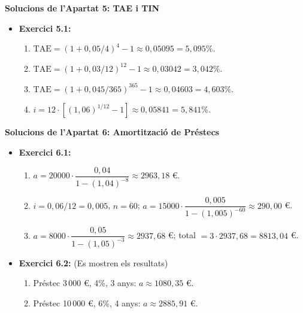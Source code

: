 \documentclass[12pt]{article}
\begin{document}
\begin{solucio}
\textbf{Solucions de l'Apartat 5: TAE i TIN}
\begin{itemize}
    \item \textbf{Exercici 5.1:}
    \begin{enumerate}[label=\alph*)]
        \item $\text{TAE} = (1 + 0{,}05/4)^4 - 1 \approx 0{,}05095 = 5{,}095\%$.
        \item $\text{TAE} = (1 + 0{,}03/12)^{12} - 1 \approx 0{,}03042 = 3{,}042\%$.
        \item $\text{TAE} = (1 + 0{,}045/365)^{365} - 1 \approx 0{,}04603 = 4{,}603\%$.
        \item $i = 12 \cdot [(1{,}06)^{1/12} - 1] \approx 0{,}05841 = 5{,}841\%$.
    \end{enumerate}
\end{itemize}
\end{solucio}

\begin{solucio}
\textbf{Solucions de l'Apartat 6: Amortització de Préstecs}
\begin{itemize}
    \item \textbf{Exercici 6.1:}
    \begin{enumerate}[label=\alph*)]
        \item $a = 20000 \cdot \dfrac{0{,}04}{1-(1{,}04)^{-8}} \approx 2963{,}18$ €.
        \item $i = 0{,}06/12 = 0{,}005$, $n=60$; $a = 15000 \cdot \dfrac{0{,}005}{1-(1{,}005)^{-60}} \approx 290{,}00$ €.
        \item $a = 8000 \cdot \dfrac{0{,}05}{1-(1{,}05)^{-3}} \approx 2937{,}68$ €; total $= 3 \cdot 2937{,}68 = 8813{,}04$ €.
    \end{enumerate}
    \item \textbf{Exercici 6.2:} (Es mostren els resultats)
    \begin{enumerate}[label=\alph*)]
        \item Préstec 3\,000 €, 4\%, 3 anys: $a \approx 1080{,}35$ €.
        \item Préstec 10\,000 €, 6\%, 4 anys: $a \approx 2885{,}91$ €.
    \end{enumerate}
\end{itemize}
\end{solucio}
\end{document}
